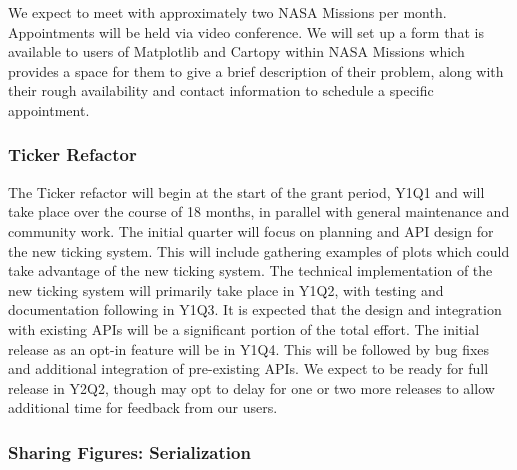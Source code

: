 \documentclass[12pt]{article}
\numberwithin{page}{section}
\begin{document}
We expect to meet with approximately two NASA Missions per month.
Appointments will be held via video conference.
We will set up a form that is available to users of Matplotlib and Cartopy within NASA Missions which provides a space for them to give a brief description of their problem, along with their rough availability and contact information to schedule a specific appointment.

\subsubsection{Ticker Refactor}

The Ticker refactor will begin at the start of the grant period, Y1Q1 and will take place over the course of 18 months, in parallel with general maintenance and community work.
The initial quarter will focus on planning and API design for the new ticking system.
This will include gathering examples of plots which could take advantage of the new ticking system.
The technical implementation of the new ticking system will primarily take place in Y1Q2, with testing and documentation following in Y1Q3.
It is expected that the design and integration with existing APIs will be a significant portion of the total effort.
The initial release as an opt-in feature will be in Y1Q4.
This will be followed by bug fixes and additional integration of pre-existing APIs.
We expect to be ready for full release in Y2Q2, though may opt to delay for one or two more releases to allow additional time for feedback from our users.


\subsubsection{Sharing Figures: Serialization}
\end{document}
